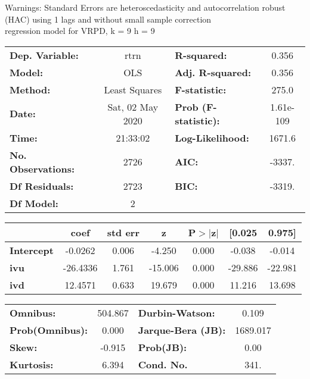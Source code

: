 Warnings: \newline
 [1] Standard Errors are heteroscedasticity and autocorrelation robust (HAC) using 1 lags and without small sample correction\\ 

regression model for VRPD, k = 9 h = 9\begin{center}
\begin{tabular}{lclc}
\toprule
\textbf{Dep. Variable:}    &       rtrn       & \textbf{  R-squared:         } &     0.356   \\
\textbf{Model:}            &       OLS        & \textbf{  Adj. R-squared:    } &     0.356   \\
\textbf{Method:}           &  Least Squares   & \textbf{  F-statistic:       } &     275.0   \\
\textbf{Date:}             & Sat, 02 May 2020 & \textbf{  Prob (F-statistic):} & 1.61e-109   \\
\textbf{Time:}             &     21:33:02     & \textbf{  Log-Likelihood:    } &    1671.6   \\
\textbf{No. Observations:} &        2726      & \textbf{  AIC:               } &    -3337.   \\
\textbf{Df Residuals:}     &        2723      & \textbf{  BIC:               } &    -3319.   \\
\textbf{Df Model:}         &           2      & \textbf{                     } &             \\
\bottomrule
\end{tabular}
\begin{tabular}{lcccccc}
                   & \textbf{coef} & \textbf{std err} & \textbf{z} & \textbf{P$> |$z$|$} & \textbf{[0.025} & \textbf{0.975]}  \\
\midrule
\textbf{Intercept} &      -0.0262  &        0.006     &    -4.250  &         0.000        &       -0.038    &       -0.014     \\
\textbf{ivu}       &     -26.4336  &        1.761     &   -15.006  &         0.000        &      -29.886    &      -22.981     \\
\textbf{ivd}       &      12.4571  &        0.633     &    19.679  &         0.000        &       11.216    &       13.698     \\
\bottomrule
\end{tabular}
\begin{tabular}{lclc}
\textbf{Omnibus:}       & 504.867 & \textbf{  Durbin-Watson:     } &    0.109  \\
\textbf{Prob(Omnibus):} &   0.000 & \textbf{  Jarque-Bera (JB):  } & 1689.017  \\
\textbf{Skew:}          &  -0.915 & \textbf{  Prob(JB):          } &     0.00  \\
\textbf{Kurtosis:}      &   6.394 & \textbf{  Cond. No.          } &     341.  \\
\bottomrule
\end{tabular}
\end{center}

